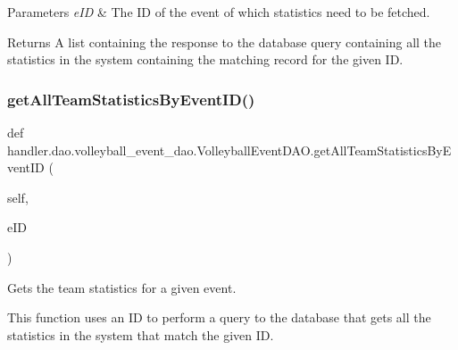 \begin{DoxyParams}{Parameters}
{\em e\+ID} & The ID of the event of which statistics need to be fetched.\\
\hline
\end{DoxyParams}
\begin{DoxyReturn}{Returns}
A list containing the response to the database query containing all the statistics in the system containing the matching record for the given ID. 
\end{DoxyReturn}
\mbox{\label{classhandler_1_1dao_1_1volleyball__event__dao_1_1_volleyball_event_d_a_o_a07d3632ae537970ac89fc1eca8937df6}} 
\subsubsection{\texorpdfstring{get\+All\+Team\+Statistics\+By\+Event\+I\+D()}{getAllTeamStatisticsByEventID()}}
{\footnotesize\ttfamily def handler.\+dao.\+volleyball\+\_\+event\+\_\+dao.\+Volleyball\+Event\+D\+A\+O.\+get\+All\+Team\+Statistics\+By\+Event\+ID (\begin{DoxyParamCaption}\item[{}]{self,  }\item[{}]{e\+ID }\end{DoxyParamCaption})}



Gets the team statistics for a given event. 

This function uses an ID to perform a query to the database that gets all the statistics in the system that match the given ID.


